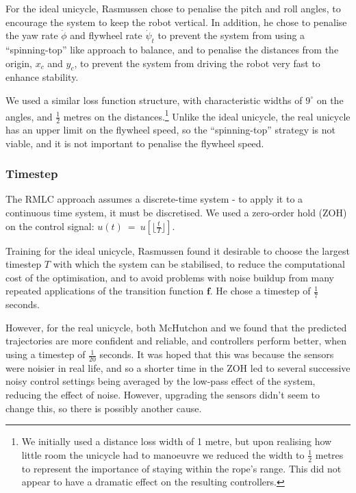\documentclass{IIBproject}
\begin{document}
For the ideal unicycle, Rasmussen chose to penalise the pitch and roll angles,
to encourage the system to keep the robot vertical.  In addition, he chose to
penalise the yaw rate $\dot{\phi}$ and flywheel rate $\dot{\psi}_t$ to prevent
the system from using a ``spinning-top'' like approach to balance, and to
penalise the distances from the origin, $x_c$ and $y_c$, to prevent the system
from driving the robot very fast to enhance stability.

We used a similar loss function structure, with characteristic widths of
$9^\circ$ on the angles, and $\frac{1}{2}$ metres on the
distances.\footnote{We initially used a distance loss width of 1 metre, but
upon realising how little room the unicycle had to manoeuvre we reduced the
width to $\frac{1}{2}$ metres to represent the importance of staying within
the rope's range. This did not appear to have a dramatic effect on the
resulting controllers.} Unlike
the ideal unicycle, the real unicycle has an upper limit on the flywheel
speed, so the ``spinning-top'' strategy is not viable, and it is not important
to penalise the flywheel speed.

\subsubsection{Timestep}
\label{sec:timestep}

The RMLC approach assumes a discrete-time system - to apply it to a continuous
time system, it must be discretised. We used a zero-order hold (ZOH) on the
control signal: $u(t)~=~u[\lfloor\frac{t}{T}\rfloor]$.

Training for the ideal unicycle, Rasmussen found it desirable to choose the
largest timestep $T$ with which the system can be stabilised, to reduce the
computational cost of the optimisation, and to avoid problems with noise
buildup from many repeated applications of the transition function
$\boldsymbol{f}$. He chose a timestep of $\frac{1}{7}$ seconds.

However, for the real unicycle, both McHutchon and we found that the predicted
trajectories are more confident and reliable, and controllers perform better,
when using a timestep of $\frac{1}{20}$ seconds. It was hoped that this was
because the sensors were noisier in real life, and so a shorter time in the
ZOH led to several successive noisy control settings being averaged by the
low-pass effect of the system, reducing the effect of noise. However,
upgrading the sensors didn't seem to change this, so there is possibly another
cause.
\end{document}

